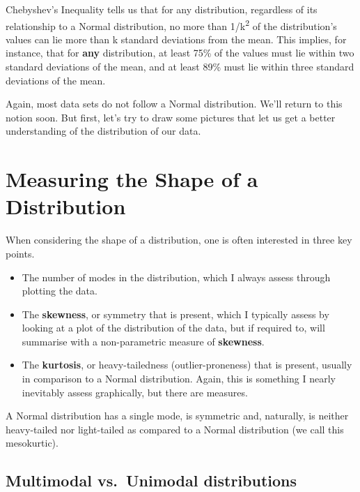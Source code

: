 \documentclass[
]{book}
\providecommand{\tightlist}{%
  \setlength{\itemsep}{0pt}\setlength{\parskip}{0pt}}
\begin{document}
Chebyshev's Inequality tells us that for any distribution, regardless of its relationship to a Normal distribution, no more than 1/k\textsuperscript{2} of the distribution's values can lie more than k standard deviations from the mean. This implies, for instance, that for \textbf{any} distribution, at least 75\% of the values must lie within two standard deviations of the mean, and at least 89\% must lie within three standard deviations of the mean.

Again, most data sets do not follow a Normal distribution. We'll return to this notion soon. But first, let's try to draw some pictures that let us get a better understanding of the distribution of our data.

\hypertarget{measuring-the-shape-of-a-distribution}{%
\section{Measuring the Shape of a Distribution}\label{measuring-the-shape-of-a-distribution}}

When considering the shape of a distribution, one is often interested in three key points.

\begin{itemize}
\tightlist
\item
  The number of modes in the distribution, which I always assess through plotting the data.
\item
  The \textbf{skewness}, or symmetry that is present, which I typically assess by looking at a plot of the distribution of the data, but if required to, will summarise with a non-parametric measure of \textbf{skewness}.
\item
  The \textbf{kurtosis}, or heavy-tailedness (outlier-proneness) that is present, usually in comparison to a Normal distribution. Again, this is something I nearly inevitably assess graphically, but there are measures.
\end{itemize}

A Normal distribution has a single mode, is symmetric and, naturally, is neither heavy-tailed nor light-tailed as compared to a Normal distribution (we call this mesokurtic).

\hypertarget{multimodal-vs.-unimodal-distributions}{%
\subsection{Multimodal vs.~Unimodal distributions}\label{multimodal-vs.-unimodal-distributions}}
\end{document}
